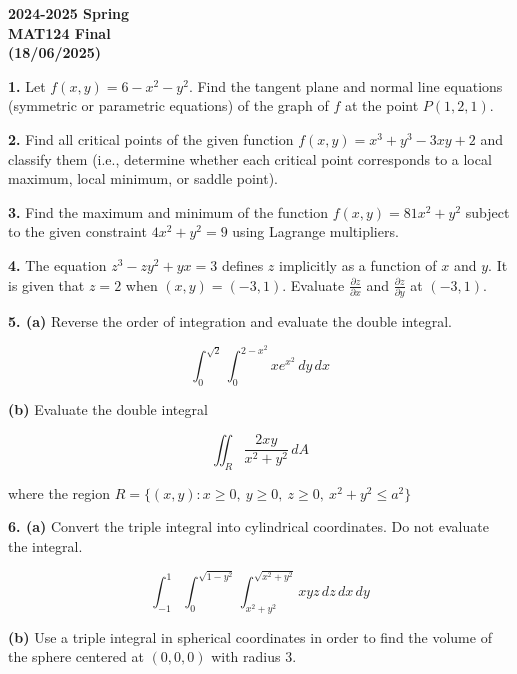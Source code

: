 \documentclass{article}
\begin{document}
\pagestyle{empty}
\large

\begin{center}
\textbf{2024-2025 Spring \\MAT124 Final\\(18/06/2025)}
\end{center}

\textbf{1.} Let $f(x,y)=6-x^2-y^2$. Find the tangent plane and normal line equations (symmetric or parametric equations) of the graph of $f$ at the point $P(1,2,1)$.

\vspace{1em}

\textbf{2.} Find all critical points of the given function $f(x,y)=x^3+y^3-3xy+2$ and classify them (i.e., determine whether each critical point corresponds to a local maximum, local minimum, or saddle point).

\vspace{1em}

\textbf{3.} Find the maximum and minimum of the function $f(x,y)=81x^2+y^2$ subject to the given constraint $4x^2+y^2=9$ using Lagrange multipliers.

\vspace{1em}

\textbf{4.} The equation $z^3-zy^2+yx=3$ defines $z$ implicitly as a function of $x$ and $y$. It is given that $z=2$ when $(x,y)=(-3,1)$. Evaluate $\displaystyle\frac{\partial z}{\partial x}$ and $\displaystyle\frac{\partial z}{\partial y}$ at $(-3,1)$.

\vspace{1em}

\textbf{5. (a)} Reverse the order of integration and evaluate the double integral.

\[\int_0^{\sqrt2}\int_0^{2-x^2}x{e}^{x^2}\,dy\,dx\]
 
\textbf{(b)} Evaluate the double integral

\[\iint_R \frac{2xy}{x^2+y^2}\,dA\]

where the region $R = \{(x,y): x\geq0,\:y\geq0,\:z\geq0,\:x^2+y^2\leq a^2\}$

\vspace{1em}

\textbf{6. (a)} Convert the triple integral into cylindrical coordinates. Do not evaluate the integral.

\[\int_{-1}^1\int_0^{\sqrt{1-y^2}}\int_{x^2+y^2}^{\sqrt{x^2+y^2}}xyz\,dz\,dx\,dy\]

\textbf{(b)} Use a triple integral in spherical coordinates in order to find the volume of the sphere centered at $(0,0,0)$ with radius $3$.
\end{document}
